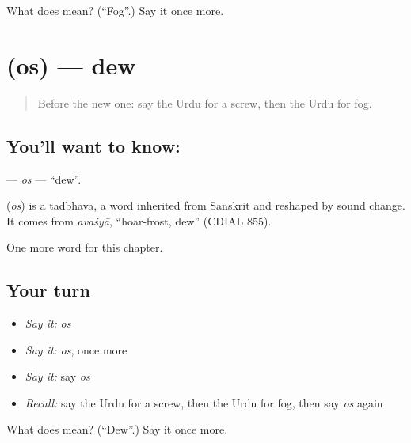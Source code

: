\begin{tcolorbox}[breakable,colback=teal!4,colframe=teal!35!black,title={Before you move on}]
What does  mean? (\textquotedblleft{}Fog\textquotedblright{}.) Say it once more.
\end{tcolorbox}
\section[\texorpdfstring{\ur{اوس} (os)}{اوس (os)}]{ (os) — dew}

\label{lesson:UR-C233-os}



\begin{quote}
Before the new one: say the Urdu for a screw, then the Urdu for fog.
\end{quote}

\subsection*{You'll want to know: }
\textbf{} — \emph{os} — \textquotedblleft{}dew\textquotedblright{}.

\begin{cousinweb}
\textbf{} (\emph{os}) is a tadbhava, a word inherited from Sanskrit and reshaped by sound change. It comes from \emph{avaśyā}, \textquotedblleft{}hoar-frost, dew\textquotedblright{} (CDIAL 855).
\end{cousinweb}

\begin{grammarlens}[title={What you've built}]
One more word for this chapter.
\end{grammarlens}

\subsection*{Your turn}
\begin{itemize}
\raggedright
  \item \emph{Say it:} \emph{os}
  \item \emph{Say it:} \emph{os}, once more
  \item \emph{Say it:} say \emph{os}
  \item \emph{Recall:} say the Urdu for a screw, then the Urdu for fog, then say \emph{os} again
\end{itemize}

\begin{tcolorbox}[breakable,colback=teal!4,colframe=teal!35!black,title={Before you move on}]
What does  mean? (\textquotedblleft{}Dew\textquotedblright{}.) Say it once more.
\end{tcolorbox}
